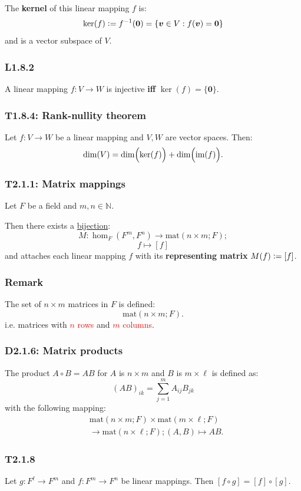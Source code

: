\documentclass{article}
\newcommand{\deq}{\vcentcolon=}
\newcommand{\vc}[1]{\boldsymbol{#1}}
\begin{document}
\begin{multicols*}{3}
The \textbf{kernel} of this linear mapping $f$ is:
$$\ker(f)\deq f^{-1}(\vc{0})
=\{\vc{v}\in V:f(\vc{v})=\vc{0}\}$$
and is a vector subspace of $V$.

\subsubsection*{L1.8.2}
A linear mapping $f:V\rightarrow W$ is injective
\textbf{if{}f} $\ker(f)=\{\vc{0}\}$.

\subsubsection*{T1.8.4: Rank-nullity theorem}
Let $f:V\rightarrow W$ be a linear mapping and
$V,W$ are vector spaces. Then:
$$\dim(V)=\dim\Bigl(\ker(f)\Bigr)
+\dim\Bigl(\text{im}(f)\Bigr).$$

\subsubsection*{T2.1.1: Matrix mappings}
Let $F$ be a field and $m,n\in\mathbb{N}$.

Then there exists a \underline{bijection}:
$$M:\hom_F(F^m,F^n)\rightarrow\text{mat}(n\times m;F);$$
$$f\mapsto[f]$$
and attaches each linear mapping $f$ with its
\textbf{representing matrix} $M(f)\deq[f]$.

\subsubsection*{Remark}
The set of $n\times m$ matrices in $F$ is defined:
$$\text{mat}(n\times m;F).$$
i.e. 
matrices with \textcolor{red}{$n$ rows}
and \textcolor{red}{$m$ columns}.


\subsubsection*{D2.1.6: Matrix products}
The product $A\circ B=AB$ for $A$ is $n\times m$
and $B$ is $m\times\ell$ is defined as:
$$(AB)_{ik}=\sum_{j=1}^{m}A_{ij}B_{jk}$$
with the following mapping:
\begin{align*}
    &\text{mat}(n\times m;F)\times\text{mat}(m\times\ell;F) \\
    &\rightarrow\text{mat}(n\times\ell;F);(A,B)\mapsto AB.
\end{align*}

\subsubsection*{T2.1.8}
Let $g:F^{\ell}\rightarrow F^m$ and
$f:F^{m}\rightarrow F^{n}$ be linear mappings.
Then $[f\circ g]=[f]\circ[g]$.


\end{multicols*}
\end{document}
